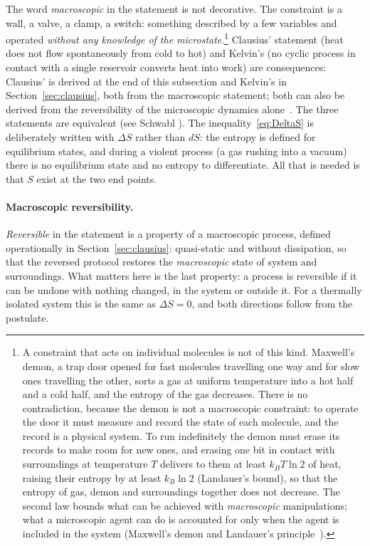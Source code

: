 \documentclass[10pt,a4paper]{article}
\theoremstyle{remark}
\begin{document}
The word \emph{macroscopic} in the statement is not decorative. The
constraint is a wall, a valve, a clamp, a switch: something described by a few
variables and operated \emph{without any knowledge of the microstate}.\footnote{%
A constraint that acts on individual molecules is not of this kind.
Maxwell's demon, a trap door opened for fast molecules travelling one way and for slow ones
travelling the other, sorts a gas at uniform temperature into a hot half and a
cold half, and the entropy of the gas decreases. There is no contradiction,
because the demon is not a macroscopic constraint: to operate the door it must
measure and record the state of each molecule, and the record is a physical
system. To run indefinitely the demon must erase its records to make room for
new ones, and erasing one bit in contact with surroundings at temperature $T$
delivers to them at least $k_BT\ln2$ of heat, raising their entropy by at least
$k_B\ln2$ (Landauer's bound), so that the entropy of gas, demon and surroundings
together does not decrease. The second law bounds what can be achieved with
\emph{macroscopic} manipulations; what a microscopic agent can do is accounted for
only when the agent is included in the system (Maxwell's demon and Landauer's
principle~\cite{ThermalNotes}).
}
Clausius' statement (heat does not flow spontaneously from cold to hot) and
Kelvin's (no cyclic process in contact with a single reservoir converts heat
into work) are consequences: Clausius' is derived at the end of this
subsection and Kelvin's in Section~\ref{sec:clausius}, both from the
macroscopic statement; both can also be derived from the reversibility of the
microscopic dynamics alone~\cite{ThermalNotes}. The three statements are equivalent (see Schwabl
\cite{Schwabl}). The inequality~\eqref{eq:DeltaS} is deliberately written
with $\Delta S$ rather than $dS$: the entropy is defined for equilibrium
states, and during a violent process (a gas rushing into a vacuum) there is no
equilibrium state and no entropy to differentiate. All that is needed is that
$S$ exist at the two end points.

\paragraph{Macroscopic reversibility.} \emph{Reversible} in the statement is a
property of a macroscopic process, defined operationally in
Section~\ref{sec:clausius}: quasi-static and without dissipation, so that the
reversed protocol restores the \emph{macroscopic} state of system and surroundings.
What matters here is the last property: a process is reversible if it can be
undone with nothing changed, in the system or outside it. For a thermally
isolated system this is the same as $\Delta S=0$, and both directions follow
from the postulate.
\end{document}
